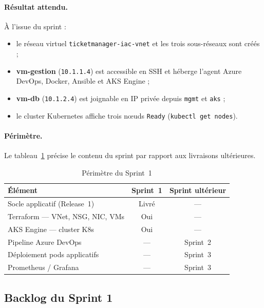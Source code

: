 \paragraph{Résultat attendu.}
À l'issue du sprint :
\begin{itemize}
  \item le réseau virtuel \texttt{ticketmanager-iac-vnet} et les trois sous-réseaux sont
        créés ;
  \item \textbf{vm-gestion} (\texttt{10.1.1.4}) est accessible en SSH et héberge l'agent
        Azure DevOps, Docker, Ansible et AKS Engine ;
  \item \textbf{vm-db} (\texttt{10.1.2.4}) est joignable en IP privée depuis \texttt{mgmt}
        et \texttt{aks} ;
  \item le cluster Kubernetes affiche trois nœuds \texttt{Ready}
        (\texttt{kubectl get nodes}).
\end{itemize}

\paragraph{Périmètre.}
Le tableau~\ref{tab:r2-s1-perimetre} précise le contenu du sprint par rapport aux livraisons
ultérieures.

\begin{table}[H]
\centering
\caption{Périmètre du Sprint~1}
\label{tab:r2-s1-perimetre}
\footnotesize
\renewcommand{\arraystretch}{1.1}
\setlength{\tabcolsep}{6pt}
\begin{tabular}{|p{5.5cm}|c|c|}
\hline
\textbf{Élément} & \textbf{Sprint~1} & \textbf{Sprint ultérieur} \\
\hline
Socle applicatif (Release~1) & Livré & — \\
\hline
Terraform — VNet, NSG, NIC, VMs & Oui & — \\
\hline
AKS Engine — cluster K8s & Oui & — \\
\hline
Pipeline Azure DevOps & — & Sprint~2 \\
\hline
Déploiement pods applicatifs & — & Sprint~3 \\
\hline
Prometheus / Grafana & — & Sprint~3 \\
\hline
\end{tabular}
\end{table}


\subsection{Backlog du Sprint 1}


